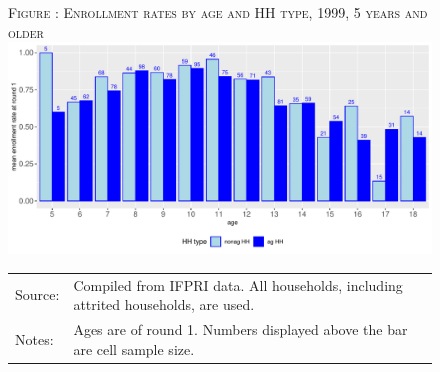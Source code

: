 \documentclass[12pt,letterpaper]{article}
\newcommand{\0}{\ensuremath{\mbox{\boldmath $0$}}}
\begin{document}
{\begin{figure}[h!]
\hfil\textsc{\footnotesize Figure \thefigure: Enrollment rates by age and HH type, 1999, 5 years and older\label{ERbyAge rawdata}}\\
\hfil \includegraphics[width=.7\paperwidth]{Figures/AgewiseRawEnrollmentRates.pdf}\\
\renewcommand{\arraystretch}{1}
\hfil\begin{tabular}{>{\hfill\scriptsize}p{1cm}<{}>{\scriptsize}p{12cm}<{\hfill}}
Source:& Compiled from IFPRI data. All households, including attrited households, are used.\\[-1ex]
Notes:& Ages are of round 1. Numbers displayed above the bar are cell sample size. \\[-1ex]
\end{tabular}
\end{figure}

}
\end{document}
